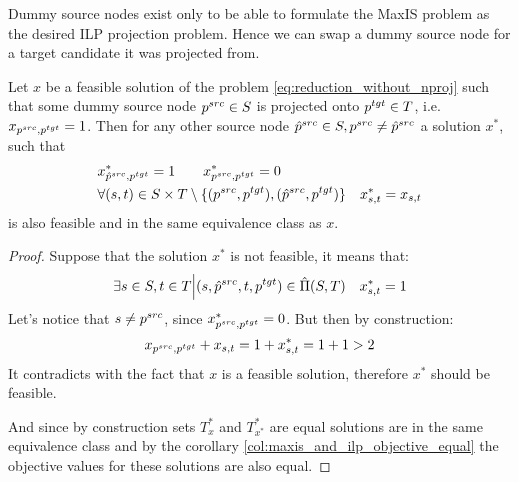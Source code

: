 Dummy source nodes exist only to be able to formulate the MaxIS problem as the desired ILP projection problem.
Hence we can swap a dummy source node for a target candidate it was projected from.
\begin{lemma} \label{lemma:swap_source_reduction}
  Let \( x \) be a feasible solution of the problem \eqref{eq:reduction_without_nproj} such that
  some dummy source node \( p^{src} \in S \) is projected onto \( p^{tgt} \in T \),
  i.e. \( x_{p^{src}, p^{tgt}} = 1 \). Then for any other source node
  \( \hat{p}^{src} \in S, p^{src} \neq \hat{p}^{src} \) a solution \( x^{*} \), such that
  \begin{align*}
    & x^*_{\hat{p}^{src}, p^{tgt}} = 1 \qquad
    x^*_{p^{src}, p^{tgt}} = 0                                                                                            \\
    & \forall (s, t) \in S \times T \setminus \{ (p^{src}, p^{tgt}), (\hat{p}^{src}, p^{tgt}) \} \quad x^*_{s,t} = x_{s,t}
  \end{align*}
  is also feasible and in the same equivalence class as \( x \).
\end{lemma}
\begin{proof}
  Suppose that the solution \( x^* \) is not feasible, it means that:
  \[
    \exists s \in S, t \in T \Big| (s, \hat{p}^{src}, t, p^{tgt}) \in \hat{\Pi}(S, T)
    \quad x^*_{s, t} = 1
  \]
  Let's notice that \( s \neq p^{src} \), since \( x^*_{p^{src}, p^{tgt}} = 0 \).
  But then by construction:
  \[
    x_{p^{src}, p^{tgt}} + x_{s, t} = 1 + x^*_{s, t} = 1 + 1 > 2
  \]
  It contradicts with the fact that \( x \) is a feasible solution, therefore \( x^* \) should be
  feasible.

  And since by construction sets \( T^*_x \) and \( T^*_{x^*} \) are equal solutions are in the same equivalence
  class and by the corollary \ref{col:maxis_and_ilp_objective_equal} the objective values for these solutions are also equal.
\end{proof}

